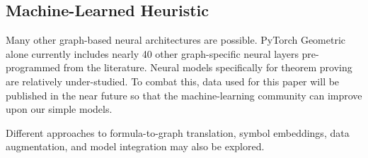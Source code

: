 \documentclass[runningheads]{llncs}
\begin{document}
\subsection{Machine-Learned Heuristic}
Many other graph-based neural architectures are possible.
PyTorch Geometric alone currently includes nearly 40 other graph-specific neural layers pre-programmed from the literature.
Neural models specifically for theorem proving are relatively under-studied.
To combat this, data used for this paper will be published in the near future so that the machine-learning community can improve upon our simple models.

Different approaches to formula-to-graph translation, symbol embeddings, data augmentation, and model integration may also be explored.


\end{document}
